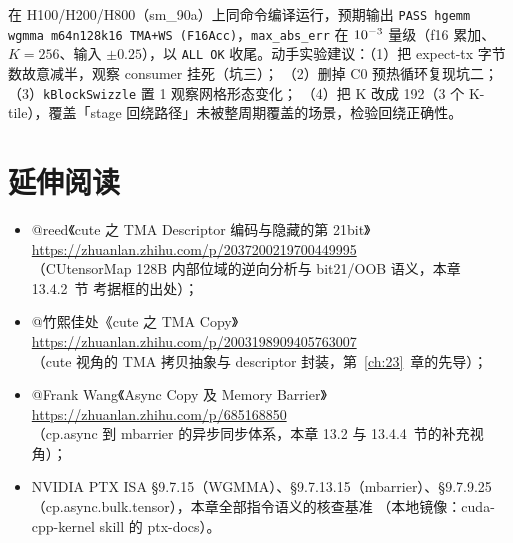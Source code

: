 在 H100/H200/H800（sm\_90a）上同命令编译运行，预期输出
\texttt{PASS hgemm wgmma m64n128k16 TMA+WS (F16Acc)}，\texttt{max\_abs\_err}
在 $10\sp{-3}$ 量级（f16 累加、$K = 256$、输入 $\pm 0.25$），以 \texttt{ALL OK}
收尾。动手实验建议：（1）把 expect-tx 字节数故意减半，观察 consumer 挂死（坑三）；
（2）删掉 C0 预热循环复现坑二；（3）\texttt{k\allowbreak{}Block\allowbreak{}Swizzle} 置 1 观察网格形态变化；
（4）把 K 改成 192（3 个 K-tile），覆盖「stage 回绕路径」未被整周期覆盖的场景，检验回绕正确性。

\section*{延伸阅读}

\begin{itemize}
  \item @reed《cute 之 TMA Descriptor 编码与隐藏的第 21bit》\\
        \url{https://zhuanlan.zhihu.com/p/2037200219700449995}\\
        （CUtensorMap 128B 内部位域的逆向分析与 bit21/OOB 语义，本章 13.4.2~节
        考据框的出处）；
  \item @竹熙佳处《cute 之 TMA Copy》\\
        \url{https://zhuanlan.zhihu.com/p/2003198909405763007}\\
        （cute 视角的 TMA 拷贝抽象与 descriptor 封装，第~\ref{ch:23}~章的先导）；
  \item @Frank Wang《Async Copy 及 Memory Barrier》\\
        \url{https://zhuanlan.zhihu.com/p/685168850}\\
        （cp.async 到 mbarrier 的异步同步体系，本章 13.2 与 13.4.4~节的补充视角）；
  \item NVIDIA PTX ISA §9.7.15（WGMMA）、§9.7.13.15（mbarrier）、§9.7.9.25
        （cp.async.bulk.tensor），本章全部指令语义的核查基准
        （本地镜像：cuda-cpp-kernel skill 的 ptx-docs）。
\end{itemize}

